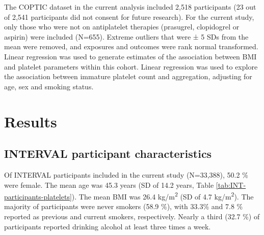 \documentclass[11pt,twoside]{bristolthesis}
\begin{document}
The COPTIC dataset in the current analysis included 2,518 participants (23 out of 2,541 participants did not consent for future research). For the current study, only those who were not on antiplatelet therapies (prasugrel, clopidogrel or aspirin) were included (N=655). Extreme outliers that were ± 5 SDs from the mean were removed, and exposures and outcomes were rank normal transformed. Linear regression was used to generate estimates of the association between BMI and platelet parameters within this cohort. Linear regression was used to explore the association between immature platelet count and aggregation, adjusting for age, sex and smoking status.

\hypertarget{results}{%
\section{Results}\label{results}}

\hypertarget{interval-participant-characteristics}{%
\subsection{INTERVAL participant characteristics}\label{interval-participant-characteristics}}

Of INTERVAL participants included in the current study (N=33,388), 50.2 \% were female. The mean age was 45.3 years (SD of 14.2 years, Table \ref{tab:INT-participants-platelets}). The mean BMI was 26.4 kg/m\textsuperscript{2} (SD of 4.7 kg/m\textsuperscript{2}). The majority of participants were never smokers (58.9 \%), with 33.3\% and 7.8 \% reported as previous and current smokers, respectively. Nearly a third (32.7 \%) of participants reported drinking alcohol at least three times a week.
\end{document}
